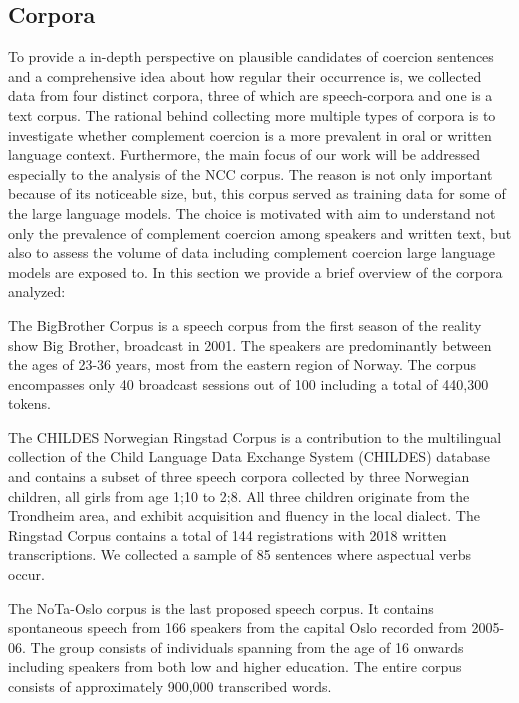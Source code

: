\documentclass{article}
\begin{document}
\subsection{Corpora}
To provide a in-depth perspective on plausible candidates of coercion sentences and a comprehensive idea about how regular their occurrence is, we collected data from four distinct corpora, three of which are speech-corpora and one is a text corpus. The rational behind collecting more multiple types of corpora is to investigate whether complement coercion is a more prevalent in oral or written language context. Furthermore, the main focus of our work will be addressed especially to the analysis of the NCC corpus. The reason is not only important because of its noticeable size, but, this corpus served as training data for some of the large language models. The choice is motivated with aim to understand not only the prevalence of complement coercion among speakers and written text, but also to assess the volume of data including complement coercion large language models are exposed to.
In this section we provide a brief overview of the corpora analyzed:

The BigBrother Corpus is a speech corpus from the first season of the reality show Big Brother, broadcast in 2001. The speakers are predominantly between the ages of 23-36 years, most from the eastern region of Norway. The corpus encompasses only 40 broadcast sessions out of 100 including a total of 440,300 tokens.

The CHILDES Norwegian Ringstad Corpus \parencite{larsen_byggeklossar_2014} is a contribution to the multilingual collection of the Child Language Data Exchange System (CHILDES) database \parencite{macwhinney_childes_2000} and contains a subset of three speech corpora collected by three Norwegian children, all girls from age 1;10 to 2;8. All three children originate from the Trondheim area, and exhibit acquisition and fluency in the local dialect. The Ringstad Corpus contains a total of 144 registrations with 2018 written transcriptions. We collected a sample of 85 sentences where aspectual verbs occur.

The NoTa-Oslo corpus \parencite{hagen_two_2014} is the last proposed speech corpus. It contains spontaneous speech from 166 speakers from the capital Oslo recorded from 2005-06. The group consists of individuals spanning from the age of 16 onwards including speakers from both low and higher education. The entire corpus consists of approximately 900,000 transcribed words.
\end{document}
